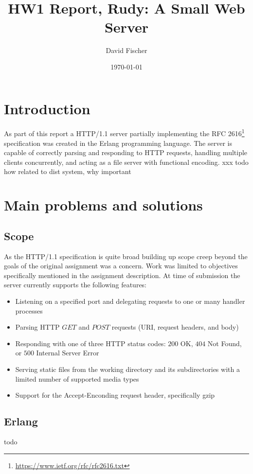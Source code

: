 \documentclass[a4paper, 11pt]{article}
\title{HW1 Report, Rudy: A Small Web Server}
\author{David Fischer}
\date{\today{}}
\begin{document}
\maketitle

\section{Introduction}

As part of this report a HTTP/1.1 server partially implementing the RFC 2616\footnote{\url{https://www.ietf.org/rfc/rfc2616.txt}} specification was created in the Erlang programming language.
The server is capable of correctly parsing and responding to HTTP requests, handling multiple clients concurrently, and acting as a file server with functional encoding. xxx todo how related to dist system, why important

\section{Main problems and solutions}

\subsection{Scope}

As the HTTP/1.1 specification is quite broad building up scope creep beyond the goals of the original assignment was a concern. Work was limited to objectives specifically mentioned in the assignment description.
At time of submission the server currently supports the following features:
\begin{itemize}
\item Listening on a specified port and delegating requests to one or many handler processes
\item Parsing HTTP $GET$ and $POST$ requests (URI, request headers, and body)
\item Responding with one of three HTTP status codes: $200$ OK, $404$ Not Found, or $500$ Internal Server Error
\item Serving static files from the working directory and its subdirectories with a limited number of supported media types
\item Support for the Accept-Enconding request header, specifically gzip
\end{itemize}

\subsection{Erlang}
todo
\end{document}
